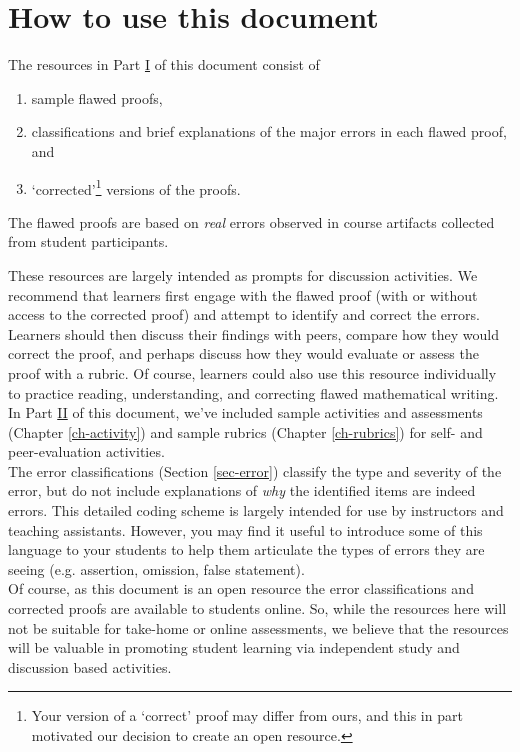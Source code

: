 \documentclass[12pt]{book}
\begin{document}
\section{How to use this document}\label{sec-how-to}
The resources in Part \hyperref[part-proofs]{I} of this document consist of
\begin{enumerate}
	\item sample flawed proofs,
	\item classifications and brief explanations of the major errors in each flawed proof, and
	\item `corrected'\footnote{Your version of a `correct' proof may differ from ours, and this in part motivated our decision to create an open resource.} versions of the proofs.
\end{enumerate}
The flawed proofs are based on \emph{real} errors observed in course artifacts collected from student participants.

These resources are largely intended as prompts for discussion activities.  We recommend that learners first engage with the flawed proof (with or without access to the corrected proof) and attempt to identify and correct the errors. Learners should then discuss their findings with peers, compare how they would correct the proof, and perhaps discuss how they would evaluate or assess the proof with a rubric.  Of course, learners could also use this resource individually to practice reading, understanding, and correcting flawed mathematical writing. \\

In Part \hyperref[part-additional]{II} of this document, we've included sample activities and assessments (Chapter \ref{ch-activity}) and sample rubrics (Chapter \ref{ch-rubrics})  for self- and peer-evaluation activities. \\

The error classifications (Section \ref{sec-error}) classify the type and severity of the error, but do not include explanations of \emph{why} the identified items are indeed errors. This detailed coding scheme is largely intended for use by instructors and teaching assistants. However, you may find it useful to introduce some of this language to your students to help them articulate the types of errors they are seeing (e.g. assertion, omission, false statement). \\

Of course, as this document is an open resource the error classifications and corrected proofs are available to students online.  So, while the resources here will not be suitable for take-home or online assessments, we believe that the resources will be valuable in promoting student learning via independent study and discussion based activities.
\end{document}

